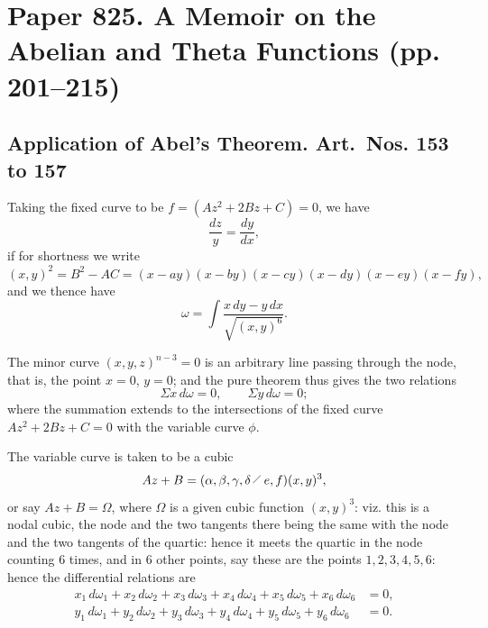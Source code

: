 \documentclass[11pt,a4paper]{book}
\begin{document}
\newpage

\section{Paper 825. A Memoir on the Abelian and Theta Functions (pp. 201--215)}


\subsection*{Application of Abel's Theorem. Art.~Nos. 153 to 157}

\begin{art}
Taking the fixed curve to be $f = (Az^2 + 2Bz + C) = 0$, we have
\[
\frac{dz}{y} = \frac{dy}{dx},
\]
if for shortness we write
\[
(x,y)^2 = B^2 - AC = (x-ay)(x-by)(x-cy)(x-dy)(x-ey)(x-fy),
\]
and we thence have
\[
\omega = \int \frac{x\,dy - y\,dx}{\sqrt{(x,y)^6}}.
\]

The minor curve $(x,y,z)^{n-3} = 0$ is an arbitrary line passing through the node, that is, the point $x=0$, $y=0$; and the pure theorem thus gives the two relations
\[
\Sigma x\,d\omega = 0, \qquad \Sigma y\,d\omega = 0;
\]
where the summation extends to the intersections of the fixed curve $Az^2 + 2Bz + C = 0$ with the variable curve $\phi$.

The variable curve is taken to be a cubic
\[
Az + B = (\alpha,\beta,\gamma,\delta\,\raisebox{0.5ex}{$\scriptstyle\diagup$}\,e,f)(x,y)^3,
\]
or say $Az + B = \Omega$, where $\Omega$ is a given cubic function $(x,y)^3$: viz. this is a nodal cubic, the node and the two tangents there being the same with the node and the two tangents of the quartic: hence it meets the quartic in the node counting 6 times, and in 6 other points, say these are the points $1,2,3,4,5,6$: hence the differential relations are
\begin{align*}
x_1\,d\omega_1 + x_2\,d\omega_2 + x_3\,d\omega_3 + x_4\,d\omega_4 + x_5\,d\omega_5 + x_6\,d\omega_6 &= 0, \\
y_1\,d\omega_1 + y_2\,d\omega_2 + y_3\,d\omega_3 + y_4\,d\omega_4 + y_5\,d\omega_5 + y_6\,d\omega_6 &= 0.
\end{align*}
\end{art}
\end{document}
